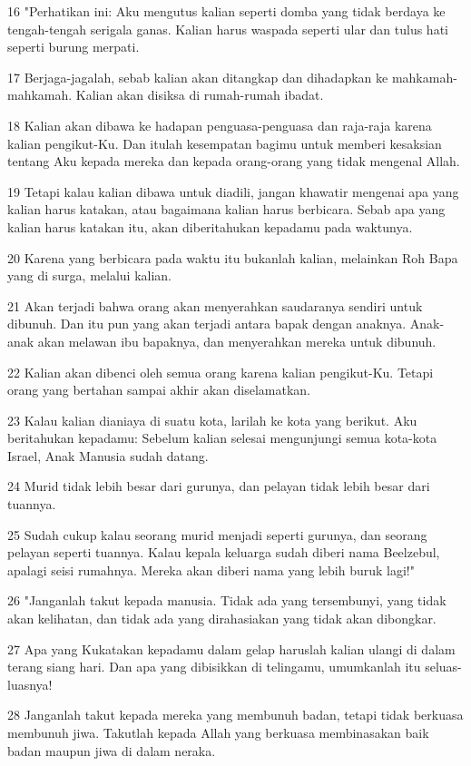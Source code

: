 \par 16 "Perhatikan ini: Aku mengutus kalian seperti domba yang tidak berdaya ke tengah-tengah serigala ganas. Kalian harus waspada seperti ular dan tulus hati seperti burung merpati.
\par 17 Berjaga-jagalah, sebab kalian akan ditangkap dan dihadapkan ke mahkamah-mahkamah. Kalian akan disiksa di rumah-rumah ibadat.
\par 18 Kalian akan dibawa ke hadapan penguasa-penguasa dan raja-raja karena kalian pengikut-Ku. Dan itulah kesempatan bagimu untuk memberi kesaksian tentang Aku kepada mereka dan kepada orang-orang yang tidak mengenal Allah.
\par 19 Tetapi kalau kalian dibawa untuk diadili, jangan khawatir mengenai apa yang kalian harus katakan, atau bagaimana kalian harus berbicara. Sebab apa yang kalian harus katakan itu, akan diberitahukan kepadamu pada waktunya.
\par 20 Karena yang berbicara pada waktu itu bukanlah kalian, melainkan Roh Bapa yang di surga, melalui kalian.
\par 21 Akan terjadi bahwa orang akan menyerahkan saudaranya sendiri untuk dibunuh. Dan itu pun yang akan terjadi antara bapak dengan anaknya. Anak-anak akan melawan ibu bapaknya, dan menyerahkan mereka untuk dibunuh.
\par 22 Kalian akan dibenci oleh semua orang karena kalian pengikut-Ku. Tetapi orang yang bertahan sampai akhir akan diselamatkan.
\par 23 Kalau kalian dianiaya di suatu kota, larilah ke kota yang berikut. Aku beritahukan kepadamu: Sebelum kalian selesai mengunjungi semua kota-kota Israel, Anak Manusia sudah datang.
\par 24 Murid tidak lebih besar dari gurunya, dan pelayan tidak lebih besar dari tuannya.
\par 25 Sudah cukup kalau seorang murid menjadi seperti gurunya, dan seorang pelayan seperti tuannya. Kalau kepala keluarga sudah diberi nama Beelzebul, apalagi seisi rumahnya. Mereka akan diberi nama yang lebih buruk lagi!"
\par 26 "Janganlah takut kepada manusia. Tidak ada yang tersembunyi, yang tidak akan kelihatan, dan tidak ada yang dirahasiakan yang tidak akan dibongkar.
\par 27 Apa yang Kukatakan kepadamu dalam gelap haruslah kalian ulangi di dalam terang siang hari. Dan apa yang dibisikkan di telingamu, umumkanlah itu seluas-luasnya!
\par 28 Janganlah takut kepada mereka yang membunuh badan, tetapi tidak berkuasa membunuh jiwa. Takutlah kepada Allah yang berkuasa membinasakan baik badan maupun jiwa di dalam neraka.
